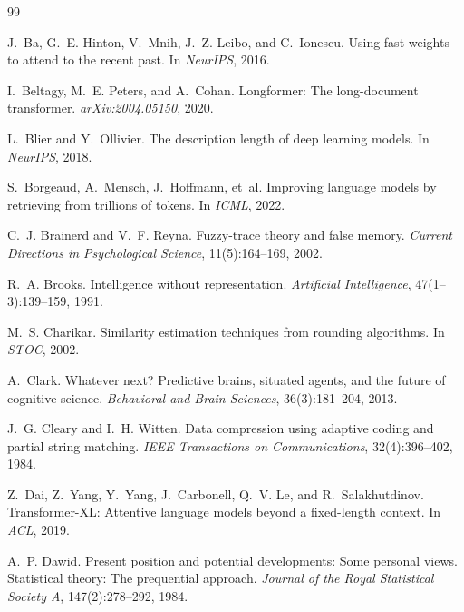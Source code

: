 \documentclass[11pt,a4paper]{article}
\theoremstyle{plain}
\theoremstyle{definition}
\theoremstyle{remark}
\begin{document}
\begin{thebibliography}{99}

J.~Ba, G.~E. Hinton, V.~Mnih, J.~Z. Leibo, and C.~Ionescu.
\newblock Using fast weights to attend to the recent past.
\newblock In \emph{NeurIPS}, 2016.

I.~Beltagy, M.~E. Peters, and A.~Cohan.
\newblock Longformer: The long-document transformer.
\newblock \emph{arXiv:2004.05150}, 2020.

L.~Blier and Y.~Ollivier.
\newblock The description length of deep learning models.
\newblock In \emph{NeurIPS}, 2018.

S.~Borgeaud, A.~Mensch, J.~Hoffmann, et~al.
\newblock Improving language models by retrieving from trillions of tokens.
\newblock In \emph{ICML}, 2022.

C.~J. Brainerd and V.~F. Reyna.
\newblock Fuzzy-trace theory and false memory.
\newblock \emph{Current Directions in Psychological Science}, 11(5):164--169,
2002.

R.~A. Brooks.
\newblock Intelligence without representation.
\newblock \emph{Artificial Intelligence}, 47(1--3):139--159, 1991.

M.~S. Charikar.
\newblock Similarity estimation techniques from rounding algorithms.
\newblock In \emph{STOC}, 2002.

A.~Clark.
\newblock Whatever next? Predictive brains, situated agents, and the future of
cognitive science.
\newblock \emph{Behavioral and Brain Sciences}, 36(3):181--204, 2013.

J.~G. Cleary and I.~H. Witten.
\newblock Data compression using adaptive coding and partial string matching.
\newblock \emph{IEEE Transactions on Communications}, 32(4):396--402, 1984.

Z.~Dai, Z.~Yang, Y.~Yang, J.~Carbonell, Q.~V. Le, and R.~Salakhutdinov.
\newblock Transformer-XL: Attentive language models beyond a fixed-length
context.
\newblock In \emph{ACL}, 2019.

A.~P. Dawid.
\newblock Present position and potential developments: Some personal views.
Statistical theory: The prequential approach.
\newblock \emph{Journal of the Royal Statistical Society A}, 147(2):278--292,
1984.


\end{thebibliography}
\end{document}

